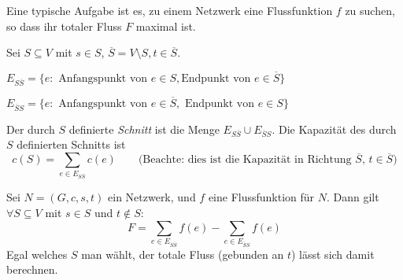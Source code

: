 \begin{bemerkung}
    Eine typische Aufgabe ist es, zu einem Netzwerk eine Flussfunktion $f$ zu
    suchen, so dass ihr totaler Fluss $F$ maximal ist.
\end{bemerkung}


\begin{definition}

    Sei $S \subseteq V$ mit $s \in S$, $\overline{S} = V \setminus S, t \in
    \overline{S}$.

    $E_{S\overline{S}} = \{ e: \text{ Anfangspunkt von $e \in S$}, \text{
    Endpunkt von $e \in \overline{S}$}\}$

    $E_{\overline{S}S} = \{ e: \text{ Anfangspunkt von $e \in \overline{S}$},
    \text{ Endpunkt von $e \in S$}\}$

    
    Der durch $S$ definierte \emph{Schnitt} ist die Menge $E_{S\overline{S}}
    \cup E_{\overline{S}S}$. Die Kapazität des durch $S$ definierten Schnitts
    ist $$c(S) = \sum_{e \in E_{S\overline{S}}} c(e) \qquad \text{(Beachte:
    dies ist die Kapazität in Richtung $\overline{S}$, $t \in \overline{S}$)}$$
\end{definition}


\begin{lemma}
    \label{totalerfluss}
    Sei $N = (G, c, s, t)$ ein Netzwerk, und $f$ eine Flussfunktion für $N$.
    Dann gilt $\forall S \subseteq V$ mit $s \in S$ und $t \notin S$: $$
    F = \sum_{e \in E_{S\overline{S}}} f(e) - \sum_{e \in E_{\overline{S}S}}
    f(e)$$
    Egal welches $S$ man wählt, der totale Fluss (gebunden an $t$) lässt sich
    damit berechnen.
\end{lemma}


